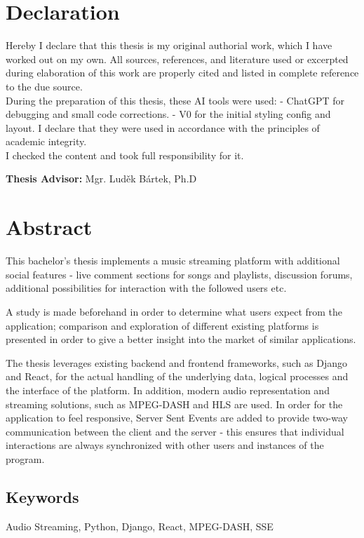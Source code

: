\section*{Declaration}
Hereby I declare that this thesis is my original authorial work, which I have worked out on my own. All
sources, references, and literature used or excerpted during elaboration of this work are properly cited and
listed in complete reference to the due source.
\\
During the preparation of this thesis, these AI tools were used:
- ChatGPT for debugging and small code corrections.
- V0 for the initial styling config and layout.
I declare that they were used in accordance with the principles of academic integrity.\\
I checked the content and took full responsibility for it.

\vfill\noindent
\textbf{Thesis Advisor:} Mgr. Luděk Bártek, Ph.D
\cleardoublepage

\section*{Abstract}
This bachelor's thesis implements a music streaming platform
with additional social features - live comment sections for songs and playlists,
discussion forums, additional possibilities for interaction with the followed users etc.

A study is made beforehand in order to determine what users expect from the application;
comparison and exploration of different existing platforms is presented in order
to give a better insight into the market of similar applications.

The thesis leverages existing backend and frontend frameworks, such as Django and React, for the
actual handling of the underlying data, logical processes and the interface of the platform.
In addition, modern audio representation and streaming solutions,
such as MPEG-DASH and HLS are used.
In order for the application to feel responsive, Server Sent Events are added to provide
two-way communication between the client and the server - this ensures that
individual interactions are always synchronized with other users and instances of the program.


\subsection*{Keywords}
Audio Streaming, Python, Django, React, MPEG-DASH, SSE
